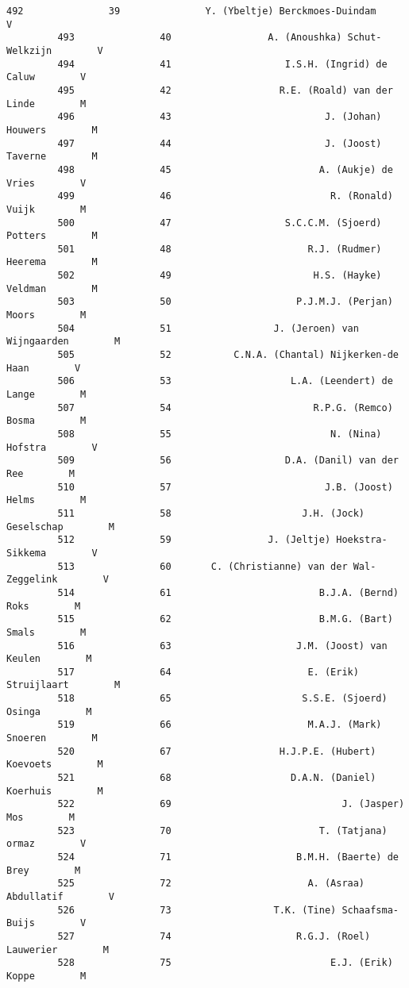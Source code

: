 \documentclass{article}
\begin{document}
\begin{Verbatim}[commandchars=\\\{\}]
         492               39               Y. (Ybeltje) Berckmoes-Duindam        V   
         493               40                 A. (Anoushka) Schut-Welkzijn        V   
         494               41                    I.S.H. (Ingrid) de Caluw        V   
         495               42                   R.E. (Roald) van der Linde        M   
         496               43                           J. (Johan) Houwers        M   
         497               44                           J. (Joost) Taverne        M   
         498               45                          A. (Aukje) de Vries        V   
         499               46                            R. (Ronald) Vuijk        M   
         500               47                    S.C.C.M. (Sjoerd) Potters        M   
         501               48                        R.J. (Rudmer) Heerema        M   
         502               49                         H.S. (Hayke) Veldman        M   
         503               50                      P.J.M.J. (Perjan) Moors        M   
         504               51                  J. (Jeroen) van Wijngaarden        M   
         505               52           C.N.A. (Chantal) Nijkerken-de Haan        V   
         506               53                     L.A. (Leendert) de Lange        M   
         507               54                         R.P.G. (Remco) Bosma        M   
         508               55                            N. (Nina) Hofstra        V   
         509               56                    D.A. (Danil) van der Ree        M   
         510               57                           J.B. (Joost) Helms        M   
         511               58                       J.H. (Jock) Geselschap        M   
         512               59                 J. (Jeltje) Hoekstra-Sikkema        V   
         513               60       C. (Christianne) van der Wal-Zeggelink        V   
         514               61                          B.J.A. (Bernd) Roks        M   
         515               62                          B.M.G. (Bart) Smals        M   
         516               63                      J.M. (Joost) van Keulen        M   
         517               64                        E. (Erik) Struijlaart        M   
         518               65                       S.S.E. (Sjoerd) Osinga        M   
         519               66                        M.A.J. (Mark) Snoeren        M   
         520               67                   H.J.P.E. (Hubert) Koevoets        M   
         521               68                     D.A.N. (Daniel) Koerhuis        M   
         522               69                              J. (Jasper) Mos        M   
         523               70                          T. (Tatjana) ormaz        V   
         524               71                      B.M.H. (Baerte) de Brey        M   
         525               72                        A. (Asraa) Abdullatif        V   
         526               73                  T.K. (Tine) Schaafsma-Buijs        V   
         527               74                      R.G.J. (Roel) Lauwerier        M   
         528               75                            E.J. (Erik) Koppe        M   
         

\end{Verbatim}
\end{document}
